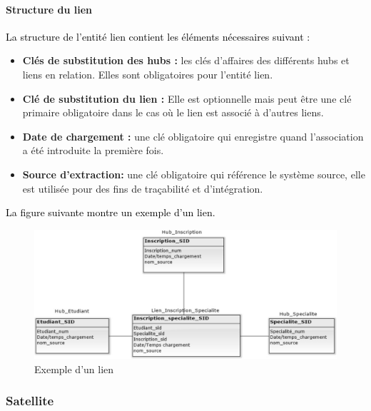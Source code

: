 \documentclass[a4paper,12pt]{report}
\begin{document}
\paragraph{Structure du lien }

\textcolor{black}{La structure de l’entité lien contient les éléments nécessaires suivant\citep{awel2014} : }

\begin{itemize}

\item	\textbf{Clés de substitution des hubs :} les clés d’affaires des différents hubs et liens en relation. Elles sont obligatoires pour l’entité lien.

\item	\textbf{Clé de substitution du lien :}  Elle est optionnelle mais peut être une clé primaire obligatoire dans le cas où le lien est associé à d’autres liens.

\item	\textbf{Date de chargement :} une clé obligatoire qui enregistre quand l’association a été introduite la première fois.


\item \textbf{ Source d’extraction:}  une clé obligatoire qui référence le système source, elle est utilisée pour des fins de traçabilité et d’intégration.

\end{itemize}

\textcolor{black}{La figure suivante montre un exemple d’un lien.}

\begin{figure}[H]

\begin{center}
\includegraphics[width=0.8\linewidth]{./images/20}
\end{center}

\caption{Exemple d’un lien}
\label{fig:20}

\end{figure}

\subsubsection{Satellite}
\end{document}
